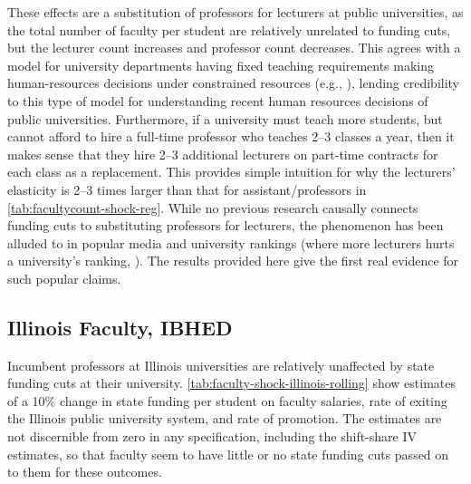 These effects are a substitution of professors for lecturers at public universities, as the total number of faculty per student are relatively unrelated to funding cuts, but the lecturer count increases and professor count decreases.
This agrees with a model for university departments having fixed teaching requirements making human-resources decisions under constrained resources (e.g., \citealt{abe2015implications}), lending credibility to this type of model for understanding recent human resources decisions of public universities.
Furthermore, if a university must teach more students, but cannot afford to hire a full-time professor who teaches 2--3 classes a year, then it makes sense that they hire 2--3 additional lecturers on part-time contracts for each class as a replacement.
This provides simple intuition for why the lecturers' elasticity is 2--3 times larger than that for assistant/professors in \autoref{tab:facultycount-shock-reg}.
While no previous research causally connects funding cuts to substituting professors for lecturers, the phenomenon has been alluded to in popular media \citep{wiu2016} and university rankings (where more lecturers hurts a university's ranking, \citealt{usnews2023}).
The results provided here give the first real evidence for such popular claims.

\subsection{Illinois Faculty, IBHED}
Incumbent professors at Illinois universities are relatively unaffected by state funding cuts at their university.
\autoref{tab:faculty-shock-illinois-rolling} show estimates of a 10\% change in state funding per student on faculty salaries, rate of exiting the Illinois public university system, and rate of promotion.
The estimates are not discernible from zero in any specification, including the shift-share IV estimates, so that faculty seem to have little or no state funding cuts passed on to them for these outcomes.

